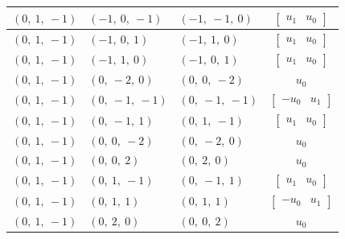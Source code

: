 \documentclass[11pt]{article}
\theoremstyle{definition}
\begin{document}
\begin{longtable}{|l|l|l|c|}
    \hline
    $\left( 0, \  1, \  -1\right)$ & $\left( -1, \  0, \  -1\right)$ & $\left( -1, \  -1, \  0\right)$ & $\left[\begin{matrix}u_{1} & u_{0}\end{matrix}\right]$ \\
    \hline
    $\left( 0, \  1, \  -1\right)$ & $\left( -1, \  0, \  1\right)$ & $\left( -1, \  1, \  0\right)$ & $\left[\begin{matrix}u_{1} & u_{0}\end{matrix}\right]$ \\
    \hline
    $\left( 0, \  1, \  -1\right)$ & $\left( -1, \  1, \  0\right)$ & $\left( -1, \  0, \  1\right)$ & $\left[\begin{matrix}u_{1} & u_{0}\end{matrix}\right]$ \\
    \hline
    $\left( 0, \  1, \  -1\right)$ & $\left( 0, \  -2, \  0\right)$ & $\left( 0, \  0, \  -2\right)$ & $u_{0}$ \\
    \hline
    $\left( 0, \  1, \  -1\right)$ & $\left( 0, \  -1, \  -1\right)$ & $\left( 0, \  -1, \  -1\right)$ & $\left[\begin{matrix}- u_{0} & u_{1}\end{matrix}\right]$ \\
    \hline
    $\left( 0, \  1, \  -1\right)$ & $\left( 0, \  -1, \  1\right)$ & $\left( 0, \  1, \  -1\right)$ & $\left[\begin{matrix}u_{1} & u_{0}\end{matrix}\right]$ \\
    \hline
    $\left( 0, \  1, \  -1\right)$ & $\left( 0, \  0, \  -2\right)$ & $\left( 0, \  -2, \  0\right)$ & $u_{0}$ \\
    \hline
    $\left( 0, \  1, \  -1\right)$ & $\left( 0, \  0, \  2\right)$ & $\left( 0, \  2, \  0\right)$ & $u_{0}$ \\
    \hline
    $\left( 0, \  1, \  -1\right)$ & $\left( 0, \  1, \  -1\right)$ & $\left( 0, \  -1, \  1\right)$ & $\left[\begin{matrix}u_{1} & u_{0}\end{matrix}\right]$ \\
    \hline
    $\left( 0, \  1, \  -1\right)$ & $\left( 0, \  1, \  1\right)$ & $\left( 0, \  1, \  1\right)$ & $\left[\begin{matrix}- u_{0} & u_{1}\end{matrix}\right]$ \\
    \hline
    $\left( 0, \  1, \  -1\right)$ & $\left( 0, \  2, \  0\right)$ & $\left( 0, \  0, \  2\right)$ & $u_{0}$ \\

\end{longtable}
\end{document}
